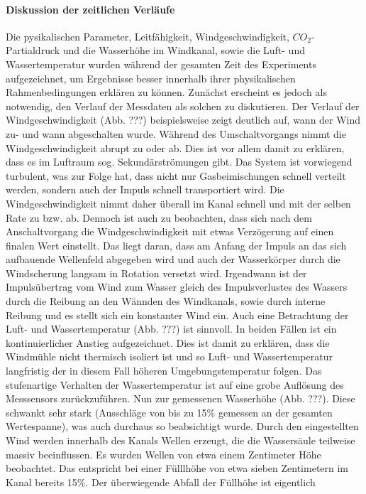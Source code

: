 \documentclass[12pt]{article}
\begin{document}
\paragraph{Diskussion der zeitlichen Verläufe\\}
Die pysikalischen Parameter, Leitfähigkeit, Windgeschwindigkeit, $CO_2$-Partialdruck und die Wasserhöhe im Windkanal, sowie die Luft- und Wassertemperatur
wurden während der gesamten Zeit des Experiments aufgezeichnet, um Ergebnisse besser innerhalb ihrer physikalischen Rahmenbedingungen
erklären zu können. Zunächst erscheint es jedoch als notwendig, den Verlauf der Messdaten als solchen zu diskutieren.
Der Verlauf der Windgeschwindigkeit (Abb. ???) beispielsweise zeigt deutlich auf, wann der Wind zu- und wann abgeschalten wurde. Während des
Umschaltvorgangs nimmt die Windgeschwindigkeit abrupt zu oder ab. Dies ist vor allem damit zu erklären, dass es im Luftraum sog.
Sekundärströmungen gibt. Das System ist vorwiegend turbulent, was zur Folge hat, dass nicht nur Gasbeimischungen schnell
verteilt werden, sondern auch der Impuls schnell transportiert wird. Die Windgeschwindigkeit nimmt daher überall im Kanal
schnell und mit der selben Rate zu bzw. ab. Dennoch ist auch zu beobachten, dass sich nach dem Anschaltvorgang die Windgeschwindigkeit
mit etwas Verzögerung auf einen finalen Wert einstellt. Das liegt daran, dass am Anfang der Impuls an das sich aufbauende Wellenfeld abgegeben wird
und auch der Wasserkörper durch die Windscherung langsam in Rotation versetzt wird. Irgendwann ist der Impulsübertrag vom Wind zum Wasser gleich
des Impulsverlustes des Wassers durch die Reibung an den Wännden des Windkanals, sowie durch interne Reibung und es stellt sich ein konstanter Wind ein.
Auch eine Betrachtung der Luft- und Wassertemperatur (Abb. ???) ist sinnvoll. In beiden Fällen ist ein kontinuierlicher Anstieg aufgezeichnet.
Dies ist damit zu erklären, dass die Windmühle nicht thermisch isoliert ist und so Luft- und Wassertemperatur langfristig der in diesem Fall
höheren Umgebungstemperatur folgen. Das stufenartige Verhalten der Wassertemperatur ist auf eine grobe Auflösung des Messsensors zurückzuführen.
Nun zur gemessenen Wasserhöhe (Abb. ???). Diese schwankt sehr stark (Ausschläge von bis zu 15\% gemessen an der gesamten Wertespanne), was auch durchaus
so beabsichtigt wurde. Durch den eingestellten Wind werden innerhalb des Kanals Wellen erzeugt, die die Wassersäule teilweise massiv beeinflussen. Es wurden Wellen von etwa einem Zentimeter Höhe
beobachtet. Das entspricht bei einer Fülllhöhe von etwa sieben Zentimetern im Kanal bereits 15\%. Der überwiegende Abfall der Füllhöhe ist eigentlich
\end{document}
